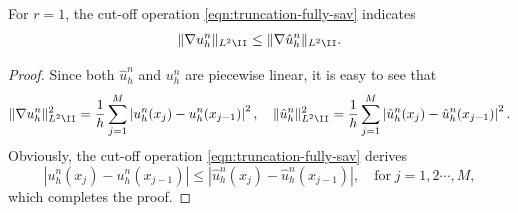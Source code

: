 \begin{lemma}\label{lem:cutoff-energy}
For $r=1$, the cut-off operation \eqref{eqn:truncation-fully-sav} indicates
\begin{align}
  \| \nabla  u_h^{n}\|_{L^2\II} \le  \| \nabla  \hat u_h^{n}\|_{L^2\II}.\label{grd-decay}
\end{align}
\end{lemma}
\begin{proof}
Since both $\hat u_h^{n}$ and $u_h^{n}$ are piecewise linear, it is easy to see that
$$\| \nabla  u_h^{n}\|_{L^2\II}^2=\frac{1}{h}\sum_{j=1}^M\left|u_h^n(x_j)-u_h^n(x_{j-1})\right|^2,\quad \|\hat u_h^{n}\|_{L^2\II}^2=\frac{1}{h}\sum_{j=1}^M\left|\hat u_h^n(x_j)-\hat u_h^n(x_{j-1})\right|^2.
$$
Obviously, the cut-off operation \eqref{eqn:truncation-fully-sav} derives
$$\left|u_h^n(x_j)-u_h^n(x_{j-1})\right|\le \left|\hat u_h^n(x_j)-\hat u_h^n(x_{j-1})\right|,\quad \text{for}\;j=1,2\cdots,M,$$
which completes the proof.
\end{proof}


